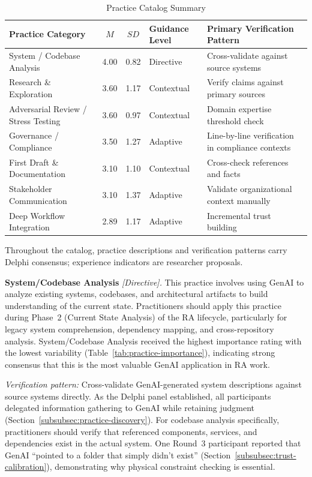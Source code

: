 \begin{table}[!ht]
    \centering
    \caption{Practice Catalog Summary}\label{tab:practice-catalog}
    \begin{tabular}{|p{4.2cm}|c|c|p{2.2cm}|p{4cm}|}
        \hline
        \textbf{Practice Category} & \textbf{$M$} & \textbf{$SD$} & \textbf{Guidance Level} & \textbf{Primary Verification Pattern} \\
        \hline
        System / Codebase Analysis & 4.00 & 0.82 & Directive & Cross-validate against source systems \\
        \hline
        Research \& Exploration & 3.60 & 1.17 & Contextual & Verify claims against primary sources \\
        \hline
        Adversarial Review / Stress Testing & 3.60 & 0.97 & Contextual & Domain expertise threshold check \\
        \hline
        Governance / Compliance & 3.50 & 1.27 & Adaptive & Line-by-line verification in compliance contexts \\
        \hline
        First Draft \& Documentation & 3.10 & 1.10 & Contextual & Cross-check references and facts \\
        \hline
        Stakeholder Communication & 3.10 & 1.37 & Adaptive & Validate organizational context manually \\
        \hline
        Deep Workflow Integration & 2.89 & 1.17 & Adaptive & Incremental trust building \\
        \hline
    \end{tabular}
\end{table}

Throughout the catalog, practice descriptions and verification patterns carry
Delphi consensus; experience indicators are researcher proposals.

\textbf{System/Codebase Analysis} \textit{[Directive].}
This practice involves using GenAI to analyze existing systems, codebases, and
architectural artifacts to build understanding of the current state. Practitioners
should apply this practice during Phase~2 (Current State Analysis) of the RA
lifecycle, particularly for legacy system comprehension, dependency mapping, and
cross-repository analysis. System/Codebase Analysis received the highest
importance rating with the lowest variability
(Table~\ref{tab:practice-importance}), indicating strong consensus that this is
the most valuable GenAI application in RA work.

\textit{Verification pattern:} Cross-validate GenAI-generated system
descriptions against source systems directly. As the Delphi panel established,
all participants delegated information gathering to GenAI while retaining
judgment (Section~\ref{subsubsec:practice-discovery}). For codebase analysis
specifically, practitioners should verify that referenced components, services,
and dependencies exist in the actual system. One Round~3 participant reported
that GenAI ``pointed to a folder that simply didn't exist''
(Section~\ref{subsubsec:trust-calibration}), demonstrating why physical
constraint checking is essential.

